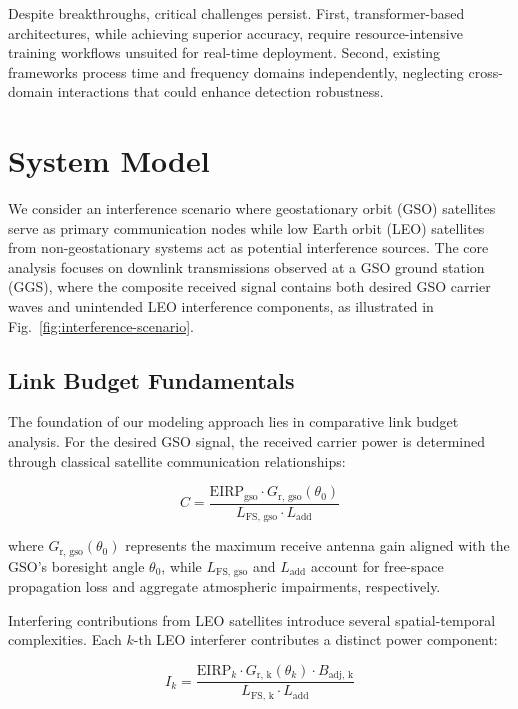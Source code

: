 \documentclass[12pt]{article}
\begin{document}
Despite breakthroughs, critical challenges persist. First, transformer-based architectures, while achieving superior accuracy, require resource-intensive training workflows unsuited for real-time deployment. Second, existing frameworks process time and frequency domains independently, neglecting cross-domain interactions that could enhance detection robustness. 


\section{System Model}
\label{sec:system_model}

We consider an interference scenario where geostationary orbit (GSO) satellites serve as primary communication nodes while low Earth orbit (LEO) satellites from non-geostationary systems act as potential interference sources. The core analysis focuses on downlink transmissions observed at a GSO ground station (GGS), where the composite received signal contains both desired GSO carrier waves and unintended LEO interference components, as illustrated in Fig.~\ref{fig:interference-scenario}.

\subsection{Link Budget Fundamentals}
The foundation of our modeling approach lies in comparative link budget analysis. For the desired GSO signal, the received carrier power is determined through classical satellite communication relationships:

\begin{equation}
    C = \frac{\text{EIRP}_{\text{gso}} \cdot G_{\text{r, gso}}(\theta_0)}{L_{\text{FS, gso}} \cdot L_{\text{add}}}
\end{equation}

where $G_{\text{r, gso}}(\theta_0)$ represents the maximum receive antenna gain aligned with the GSO's boresight angle $\theta_0$, while $L_{\text{FS, gso}}$ and $L_{\text{add}}$ account for free-space propagation loss and aggregate atmospheric impairments, respectively.

Interfering contributions from LEO satellites introduce several spatial-temporal complexities. Each $k$-th LEO interferer contributes a distinct power component:

\begin{equation}
    I_k = \frac{\text{EIRP}_k \cdot G_{\text{r, k}}(\theta_k) \cdot B_{\text{adj, k}}}{L_{\text{FS, k}} \cdot L_{\text{add}}}
\end{equation}
\end{document}
